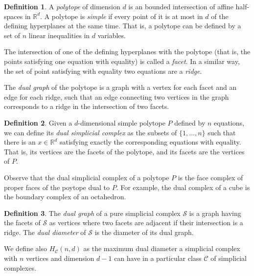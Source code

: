 \documentclass[12pt,a4paper]{article}
\theoremstyle{plain}
\theoremstyle{definition}
\newtheorem{definition}{Definition}
\begin{document}
\begin{definition}
  A \emph{polytope} of dimension $d$ is an bounded intersection of affine half-spaces in $\mathbb{R}^d$. A polytope is \emph{simple} if every point of it is at most in $d$ of the defining hyperplanes at the same time. That is, a polytope can be defined by a set of $n$ linear inequalities in $d$ variables.
  
  The intersection of one of the defining hyperplanes with the polytope (that is, the points satisfying one equation with equality) is called a \emph{facet}. In a similar way, the set of point satisfying with equality two equations are a \emph{ridge}.
  
  The \emph{dual graph} of the polytope is a graph with a vertex for each facet and an edge for each ridge, such that an edge connecting two vertices in the graph corresponds to a ridge in the intersection of two facets.
\end{definition}

\begin{definition}
  Given a $d$-dimensional simple polytope $P$ defined by $n$ equations, we can define its \emph{dual simplicial complex} as the subsets of $\{1,\dots,n\}$ such that there is an $x\in\mathbb{R}^d$ satisfying exactly the corresponding equations with equality. That is, its vertices are the facets of the polytope, and its facets are the vertices of $P$. 
\end{definition}

Observe that the dual simplicial complex of a polytope $P$ is the face complex of proper faces of the poytope dual to $P$. For example, the dual complex of a cube is the boundary complex of an octahedron.

\begin{definition}
  The \emph{dual graph} of a pure simplicial complex $\mathcal{S}$ is a graph having the facets of $\mathcal{S}$ as vertices where two facets are adjacent if their intersection is a ridge. The \emph{dual diameter} of $\mathcal{S}$ is the diameter of its dual graph.

  We define also $H_\mathcal{C}(n,d)$ as the maximum dual diameter a simplicial complex with $n$ vertices and dimension $d-1$ can have in a particular class $\mathcal{C}$ of simplicial complexes.
\end{definition}
\end{document}
